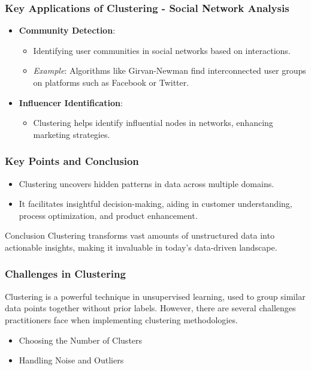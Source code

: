 \documentclass[aspectratio=169]{beamer}
\begin{document}
\begin{frame}[fragile]
    \frametitle{Key Applications of Clustering - Social Network Analysis}
    \begin{itemize}
        \item \textbf{Community Detection}:
        \begin{itemize}
            \item Identifying user communities in social networks based on interactions.
            \item \textit{Example}: Algorithms like Girvan-Newman find interconnected user groups on platforms such as Facebook or Twitter.
        \end{itemize}
        \item \textbf{Influencer Identification}:
        \begin{itemize}
            \item Clustering helps identify influential nodes in networks, enhancing marketing strategies.
        \end{itemize}
    \end{itemize}
\end{frame}

\begin{frame}[fragile]
    \frametitle{Key Points and Conclusion}
    \begin{itemize}
        \item Clustering uncovers hidden patterns in data across multiple domains.
        \item It facilitates insightful decision-making, aiding in customer understanding, process optimization, and product enhancement.
    \end{itemize}
    \begin{block}{Conclusion}
        Clustering transforms vast amounts of unstructured data into actionable insights, making it invaluable in today’s data-driven landscape.
    \end{block}
\end{frame}

\begin{frame}[fragile]
  \frametitle{Challenges in Clustering}
  Clustering is a powerful technique in unsupervised learning, used to group similar data points together without prior labels. However, there are several challenges practitioners face when implementing clustering methodologies.
  
  \begin{itemize}
    \item Choosing the Number of Clusters
    \item Handling Noise and Outliers
  \end{itemize}
\end{frame}
\end{document}
